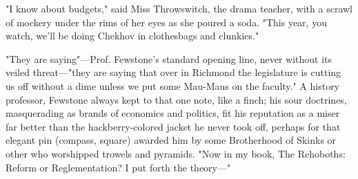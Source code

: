   "I know about budgets," said Miss Throwswitch, the drama teacher, with a
scrawl of mockery under the rims of her eyes as she poured a soda. "This year,
you watch, we'll be doing Chekhov in clothesbags and clunkies."

  "They are saying"---Prof. Fewstone's standard opening line, never without its
veiled threat---"they are saying that over in Richmond the legislature is cutting
us off without a dime unless we put some Mau-Maus on the faculty." A history
professor, Fewstone always kept to that one note, like a finch; his sour
doctrines, masquerading as brands of economics and politics, fit his reputation
as a miser far better than the hackberry-colored jacket he never took off,
perhaps for that elegant pin (compass, square) awarded him by some Brotherhood
of Skinks or other who worshipped trowels and pyramids. "Now in my book, The
Rehoboths: Reform or Reglementation? I put forth the theory---"

